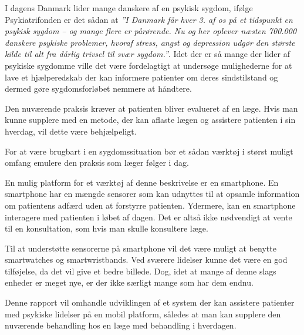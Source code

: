 


I dagens Danmark lider mange danskere af en psykisk sygdom, ifølge Psykiatrifonden er det sådan at \textit{''I Danmark får hver 3. af os på et tidspunkt en psykisk sygdom – og mange flere er pårørende. 
Nu og her oplever næsten 700.000 danskere psykiske problemer, hvoraf stress, angst og depression udgør den største kilde til alt fra dårlig trivsel til svær sygdom.''}\citep{psykiatrifonden}.
Idet der er så mange der lider af psykiske sygdomme ville det være fordelagtigt at undersøge mulighederne for at lave et hjælperedskab der kan informere patienter om deres sindstilstand og dermed gøre sygdomsforløbet nemmere at håndtere.

Den nuværende praksis kræver at patienten bliver evalueret af en læge.
Hvis man kunne supplere med en metode, der kan aflaste lægen og assistere patienten i sin hverdag, vil dette være behjælpeligt. 

For at være brugbart i en sygdomssituation bør et sådan værktøj i størst muligt omfang emulere den praksis som læger følger i dag.

En mulig platform for et værktøj af denne beskrivelse er en smartphone.
En smartphone har en mængde sensorer som kan udnyttes til at opsamle information om patientens adfærd uden at forstyrre patienten.
Ydermere, kan en smartphone interagere med patienten i løbet af dagen. 
Det er altså ikke nødvendigt at vente til en konsultation, som hvis man skulle konsultere læge.

Til at understøtte sensorerne på smartphone vil det være muligt at benytte smartwatches og smartwristbands.
Ved sværere lidelser kunne det være en god tilføjelse, da det vil give et bedre billede.
Dog, idet at mange af denne slags enheder er meget nye, er der ikke særligt mange som har dem endnu.

Denne rapport vil omhandle udviklingen af et system der kan assistere patienter med psykiske lidelser på en mobil platform, således at man kan supplere den nuværende behandling hos en læge med behandling i hverdagen.